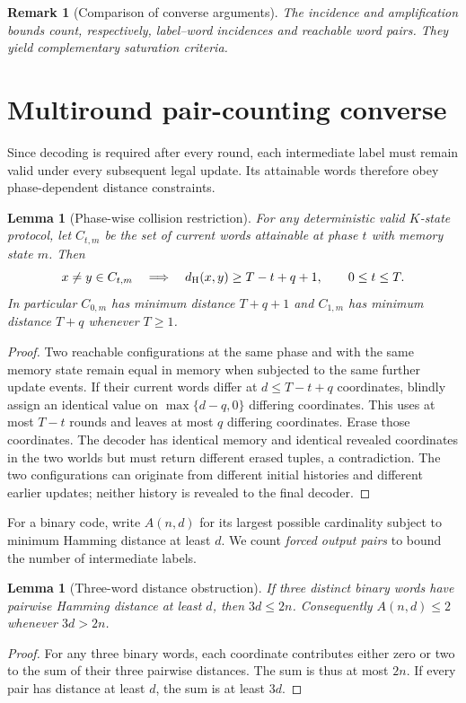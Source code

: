 \documentclass[11pt,a4paper]{article}
\newtheorem{lemma}[theorem]{Lemma}
\newtheorem{remark}[theorem]{Remark}
\begin{document}
\begin{remark}[Comparison of converse arguments]
The incidence and amplification bounds count, respectively, label--word incidences and reachable word pairs. They yield complementary saturation criteria.
\end{remark}

\section{Multiround pair-counting converse}\label{sec:saturation}
Since decoding is required after every round, each intermediate label must remain valid under every subsequent legal update. Its attainable words therefore obey phase-dependent distance constraints.

\begin{lemma}[Phase-wise collision restriction]\label{lem:phase}
For any deterministic valid $K$-state protocol, let $C_{t,m}$ be the set of current words attainable at phase $t$ with memory state $m$. Then
\[
 x\ne y\in C_{t,m}\quad\Longrightarrow\quad
 d_{\rm H}(x,y)\ge T-t+q+1,
 \qquad 0\le t\le T.
\]
In particular $C_{0,m}$ has minimum distance $T+q+1$ and $C_{1,m}$ has minimum distance $T+q$ whenever $T\ge1$.
\end{lemma}
\begin{proof}
Two reachable configurations at the same phase and with the same memory state remain equal in memory when subjected to the same further update events. If their current words differ at $d\le T-t+q$ coordinates, blindly assign an identical value on $\max\{d-q,0\}$ differing coordinates. This uses at most $T-t$ rounds and leaves at most $q$ differing coordinates. Erase those coordinates. The decoder has identical memory and identical revealed coordinates in the two worlds but must return different erased tuples, a contradiction. The two configurations can originate from different initial histories and different earlier updates; neither history is revealed to the final decoder.
\end{proof}

For a binary code, write $A(n,d)$ for its largest possible cardinality subject to minimum Hamming distance at least $d$. We count \emph{forced output pairs} to bound the number of intermediate labels.

\begin{lemma}[Three-word distance obstruction]\label{lem:three}
If three distinct binary words have pairwise Hamming distance at least $d$, then $3d\le2n$. Consequently $A(n,d)\le2$ whenever $3d>2n$.
\end{lemma}
\begin{proof}
For any three binary words, each coordinate contributes either zero or two to the sum of their three pairwise distances. The sum is thus at most $2n$. If every pair has distance at least $d$, the sum is at least $3d$.
\end{proof}
\end{document}
